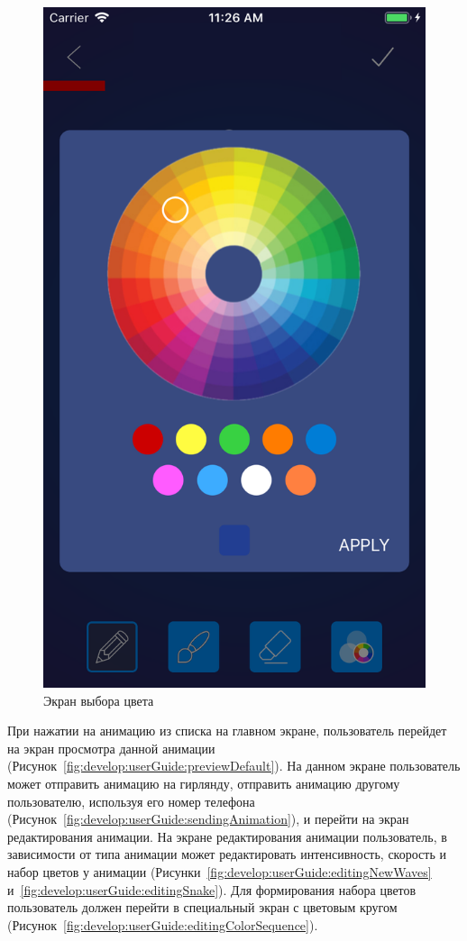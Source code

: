 \begin{figure}[H]
\centering
	\includegraphics[scale=0.2]{figures/userGuide/colorPicker.png}
	\caption{Экран выбора цвета}
	\label{fig:develop:userGuide:colorPicker}
\end{figure}

При нажатии на анимацию из списка на главном экране, пользователь перейдет на экран просмотра данной анимации (Рисунок~\ref{fig:develop:userGuide:previewDefault}). На данном экране пользователь может отправить анимацию на гирлянду, отправить анимацию другому пользователю, используя его номер телефона (Рисунок~\ref{fig:develop:userGuide:sendingAnimation}), и перейти на экран редактирования анимации. На экране редактирования анимации пользователь, в зависимости от типа анимации может редактировать интенсивность, скорость и набор цветов у анимации (Рисунки~\ref{fig:develop:userGuide:editingNewWaves} и~\ref{fig:develop:userGuide:editingSnake}). Для формирования набора цветов пользователь должен перейти в специальный экран с цветовым кругом (Рисунок~\ref{fig:develop:userGuide:editingColorSequence}).

